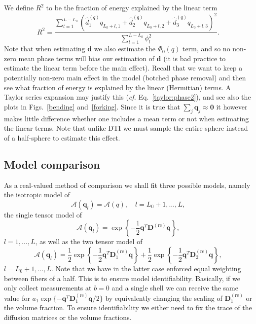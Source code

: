 \documentclass[authoryear,preprint,12pt]{elsarticle}
\newcommand{\re}{\text{re}}
\newcommand{\bq}{\mathbf{q}}
\newcommand{\bD}{\mathbf{D}}
\newcommand{\q}{\mathbf{q}}
\newcommand{\cA}{\mathcal{A}}
\newcommand{\bld}[1]{\mathbf{#1}}
\begin{document}
We define $R^2$ to be the fraction of energy explained by the linear
term
\begin{equation}
  R^2 = \frac{\sum_{l=1}^{L-L_0} \left(\hat{d}_1^{(q)}q_{L_0+l,1}
    + \hat{d}_2^{(q)}q_{L_0+l,2} + \hat{d}_3^{(q)}q_{L_0+l,3}\right)^2}
  {\sum_{l=1}^{L-L_0}\phi_l^2}.
\end{equation}
Note that when estimating $\bld{d}$ we also estimate the $\Phi_0(q)$
term, and so no non-zero mean phase terms will bias our estimation of
$\bld{d}$ (it is bad practice to estimate the linear term before the
main effect). Recall that we want to keep a potentially non-zero main
effect in the model (botched phase removal) and then see what fraction
of energy is explained by the linear (Hermitian) terms.  A Taylor
series expansion may justify this (\textit{cf.}
Eq.~\eqref{taylor:phase2}), and see also the plots in
Figs.~\ref{bending} and~\ref{forking}.  Since it is true that
$\sum_j\q_j\approx\bld{0}$ it however makes little difference whether
one includes a mean term or not when estimating the linear terms.
Note that unlike DTI we must sample the entire sphere instead of a
half-sphere to estimate this effect.

\subsection{Model comparison}

As a real-valued method of comparison we shall fit three possible
models, namely the isotropic model of
\begin{equation}\label{isotropic}
  \cA(\bq_l) = \cA(q), \quad l=L_0+1, \dots, L,
\end{equation}
the single tensor model of
\begin{equation}\label{singletensor}
  \cA(\bq_l) = \exp\left\{-\frac{1}{2}\q^T\bD^{(\re)}\q\right\}, 
\end{equation}
$l=1,\dots,L$, as well as the two tensor model of 
\begin{equation}\label{doubletensor}
  \cA(\bq_l) = \frac{1}{2}\exp\left\{-\frac{1}{2} \q^T \bD^{(\re)}_1
  \q\right\} + \frac{1}{2}\exp\left\{-\frac{1}{2} \q^T \bD^{(\re)}_2
  \q\right\},
\end{equation}
$l=L_0+1,\dots,L$.  Note that we have in the latter case enforced
equal weighting between fibers of a half.  This is to ensure model
identifiability.  Basically, if we only collect measurements at $b=0$
and a single shell we can receive the same value for
$a_1\exp\{-{\q}^T\bD^{(\re)}_1{\q}/2\}$ by equivalently changing the
scaling of $\bD^{(\re)}_1$ or the volume fraction.  To ensure
identifiability we either need to fix the trace of the diffusion
matrices or the volume fractions.
\end{document}
